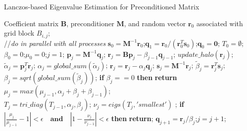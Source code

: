 \begin{algorithm}[!ht]
\caption{Lanczos-based Eigenvalue Estimation for Preconditioned Matrix}
\label{alg:lanczos_pre}
\begin{algorithmic}[1]
\REQUIRE Coefficient matrix $\textbf{B}$, preconditioner $\textbf{M}$, and random vector $\textbf{r}_0$ associated with grid block $B_{i,j}$; \\
 //\qquad    \textit{do in parallel with all processes}
\STATE $\textbf{s}_0=\textbf{M}^{-1}\textbf{r}_0$;\quad $\textbf{q}_1 = \textbf{r}_0/({\textbf{r}_0^T\textbf{s}_0})$;\quad $\textbf{q}_0=\textbf{0}$;
\STATE $T_0=\emptyset$;\quad $\beta_0 =0$;\quad  $\mu_0 =0$;\quad $j=1$;
\STATE $\textbf{p}_j = \textbf{M}^{-1}\textbf{q}_j$; \quad $\textbf{r}_j=\textbf{B}\textbf{p}_j-\beta_{j-1}\textbf{q}_{j-1}$;
\STATE $update\_halo(\textbf{r}_j)$;
\STATE $\tilde{\alpha}_j =\textbf{p}_j^T\textbf{r}_j$; \quad $\alpha_j=global\_sum(\tilde{\alpha}_j)$;
\STATE $\textbf{r}_j=\textbf{r}_j-\alpha_{j}\textbf{q}_{j}$; \quad $\textbf{s}_j = \textbf{M}^{-1}\textbf{r}_j$; 
\STATE $\tilde{\beta}_j = \textbf{r}_j^T\textbf{s}_j$; \quad $\beta_j=sqrt(global\_sum(\tilde{\beta}_j))$;
\STATE \textbf{if} $\beta_j == 0$ \textbf{then} \textbf{return}
\STATE $\mu_j = max(\mu_{j-1},\alpha_j+\beta_j+\beta_{j-1})$; \label{lan_gersh}\\
\STATE $T_j=tri\_diag(T_{j-1},\alpha_j,\beta_j)$; \label{lan_tm}
\STATE $\nu_j = eigs(T_j,'smallest')$ ; \label{lan_nu}
\STATE \textbf{if} $|\frac{\mu_j}{\mu_{j-1}} -1 |< \epsilon\quad\textbf{and}\quad|1- \frac{\nu_j}{\nu_{j-1}}|< \epsilon$ \textbf{then} \textbf{return}; \label{lanczos_converge}
\STATE $\textbf{q}_{j+1}= \textbf{r}_j/\beta_j$;\quad $j=j+1$;
\ENDWHILE
\end{algorithmic}
\end{algorithm}


